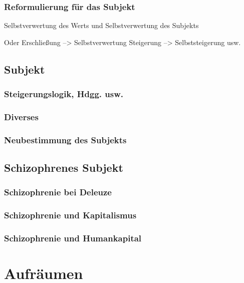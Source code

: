 \documentclass[12pt,
               DIV13,
               paper=a4,
               twoside=false,
               onehalfspacing,
               bibliography=totoc,
               toc=graduated,
               draft,
               ]{scrartcl}
\begin{document}
\subsubsection{Reformulierung für das Subjekt}

Selbstverwertung des Werts und Selbstverwertung des Subjekts

Oder Erschließung --> Selbstverwertung
Steigerung --> Selbststeigerung usw.

\subsection{Subjekt}

\subsubsection{Steigerungslogik, Hdgg. usw.}

\subsubsection{Diverses}

\subsubsection{Neubestimmung des Subjekts}

\subsection{Schizophrenes Subjekt}

\subsubsection{Schizophrenie bei Deleuze}

\subsubsection{Schizophrenie und Kapitalismus}

\subsubsection{Schizophrenie und Humankapital}

\section{Aufräumen}

\newpage
\nocite{*}
\printshorthands
\printbibliography
\end{document}
